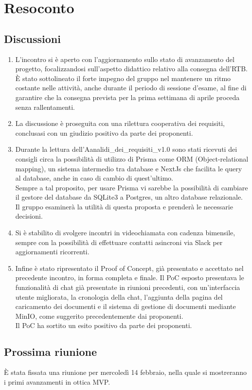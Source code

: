 \section{Resoconto} \label{sec:resoconto}
\subsection{Discussioni} \label{subsec:resdiscussione}
\begin{enumerate}
    \item L'incontro si è aperto con l'aggiornamento sullo stato di avanzamento del progetto, focalizzandosi sull'aspetto didattico relativo alla consegna dell'RTB. \\È stato sottolineato il forte impegno del gruppo nel mantenere un ritmo costante nelle attività, anche durante il periodo di sessione d'esame, al fine di garantire che la consegna prevista per la prima settimana di aprile proceda senza rallentamenti.
    
    \item La discussione è proseguita con una rilettura cooperativa dei requisiti, conclusasi con un giudizio positivo da parte dei proponenti.
    
    \item Durante la lettura dell'Aanalidi\_dei\_requisiti\_v1.0 sono stati ricevuti dei consigli circa la possibilità di utilizzo di Prisma come ORM (Object-relational mapping), un sistema intermedio tra database e NextJs che facilita le query al database, anche in caso di cambio di quest'ultimo. \\Sempre a tal proposito, per usare Prisma vi sarebbe la possibilità di cambiare il gestore del database da SQLite3 a Postgres, un altro database relazionale. \\Il gruppo esaminerà la utilità di questa proposta e prenderà le necessarie decisioni.
    \item Si è stabilito di svolgere incontri in videochiamata con cadenza bimensile, sempre con la possibilità di effettuare contatti asincroni via Slack per aggiornamenti ricorrenti.
    
    \item Infine è stato ripresentato il Proof of Concept, già presentato e accettato nel precedente incontro, in forma completa e finale. Il PoC esposto presentava le funzionalità di chat già presentate in riunioni precedenti, con un'interfaccia utente migliorata, la cronologia della chat, l'aggiunta della pagina del caricamento dei documenti e il sistema di gestione di documenti mediante MinIO, come suggerito precedentemente dai proponenti.\\
    Il PoC ha sortito un esito positivo da parte dei proponenti.
\end{enumerate}

\subsection{Prossima riunione} \label{subsec:riunione}
È stata fissata una riunione per mercoledì 14 febbraio, nella quale si mostreranno i primi avanzamenti in ottica MVP.
